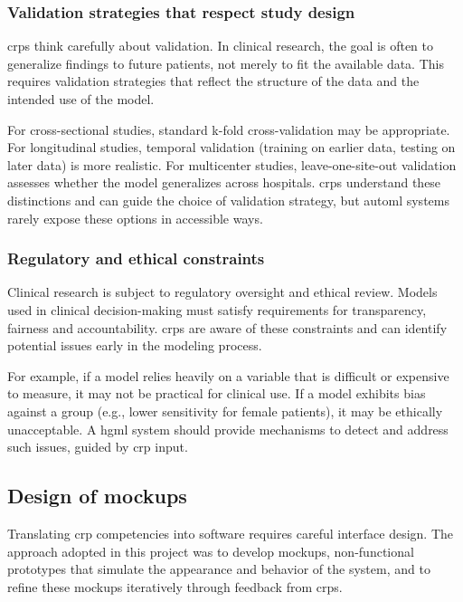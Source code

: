 \documentclass[twoside,final]{Contexto}
\begin{document}
\subsubsection{Validation strategies that respect study design}

\glspl{crp} think carefully about validation. In clinical research, the goal is often to generalize findings to future patients, not merely to fit the available data. This requires validation strategies that reflect the structure of the data and the intended use of the model.

For cross-sectional studies, standard k-fold cross-validation may be appropriate. For longitudinal studies, temporal validation (training on earlier data, testing on later data) is more realistic. For multicenter studies, leave-one-site-out validation assesses whether the model generalizes across hospitals. \glspl{crp} understand these distinctions and can guide the choice of validation strategy, but \gls{automl} systems rarely expose these options in accessible ways.

\subsubsection{Regulatory and ethical constraints}

Clinical research is subject to regulatory oversight and ethical review. Models used in clinical decision-making must satisfy requirements for transparency, fairness and accountability. \glspl{crp} are aware of these constraints and can identify potential issues early in the modeling process.

For example, if a model relies heavily on a variable that is difficult or expensive to measure, it may not be practical for clinical use. If a model exhibits bias against a group (e.g., lower sensitivity for female patients), it may be ethically unacceptable. A \gls{hgml} system should provide mechanisms to detect and address such issues, guided by \gls{crp} input.

\subsection{Design of mockups}

Translating \gls{crp} competencies into software requires careful interface design. The approach adopted in this project was to develop mockups, non-functional prototypes that simulate the appearance and behavior of the system, and to refine these mockups iteratively through feedback from \glspl{crp}.
\end{document}
